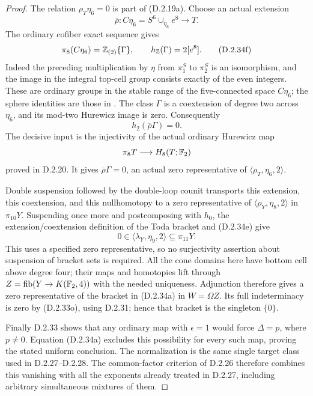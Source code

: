 \begin{proof}
The relation $\rho_T\eta_6=0$ is part of
\textup{(D.2.19a)}. Choose an actual extension
\[
 \overline\rho:C\eta_6=S^6\cup_{\eta_6}e^8
                      \longrightarrow T.
\]
The ordinary cofiber exact sequence gives
\[
 \pi_8(C\eta_6)=\mathbb Z_{(2)}\{\Gamma\},
       \qquad h_{\mathbb Z}(\Gamma)=2[e^8].
 \tag{D.2.34f}
\]
Indeed the preceding multiplication by $\eta$ from
$\pi_1^S$ to $\pi_2^S$ is an isomorphism, and the
image in the integral top-cell group consists exactly
of the even integers. These are ordinary groups in
the stable range of the five-connected space $C\eta_6$;
the sphere identities are those in
\cite[\S2, (2.1), p.~149]{I_Oka1986}.
The class $\Gamma$ is a coextension of degree two
across $\eta_6$, and its mod-two Hurewicz image is zero.
Consequently
\[
 h_2(\overline\rho\Gamma)=0.
\]
The decisive input is the injectivity of the actual
ordinary Hurewicz map
\[
               \pi_8T\longrightarrow H_8(T;\mathbb F_2)
\]
proved in \textup{D.2.20}. It gives
$\overline\rho\Gamma=0$, an actual zero representative
of $\langle\rho_T,\eta_6,2\rangle$.

Double suspension followed by the double-loop counit
transports this extension, this coextension, and this
nullhomotopy to a zero representative of
$\langle\rho_Y,\eta_8,2\rangle$ in $\pi_{10}Y$.
Suspending once more and postcomposing with $h_0$,
the extension/coextension definition of the Toda bracket
and \textup{(D.2.34e)} give
\[
            0\in\langle\lambda_Y,\eta_9,2\rangle
                    \subseteq\pi_{11}Y.
 \tag{D.2.34g}
\]
This uses a specified zero representative, so no
surjectivity assertion about suspension of bracket sets
is required. All the cone domains here have bottom cell
above degree four; their maps and homotopies lift through
$Z=\operatorname{fib}(Y\to K(\mathbb F_2,4))$ with the needed uniqueness.
Adjunction therefore gives a zero representative of the
bracket in \textup{(D.2.34a)} in $W=\Omega Z$.
Its full indeterminacy is zero by
\textup{(D.2.33o)}, using \textup{D.2.31}; hence that
bracket is the singleton $\{0\}$.

Finally \textup{D.2.33} shows that any ordinary map with
$\epsilon=1$ would force $\Delta=p$, where $p\ne0$.
Equation \textup{(D.2.34a)} excludes this possibility
for every such map, proving the stated uniform conclusion.
The normalization is the same single target class used in
\textup{D.2.27--D.2.28}. The common-factor criterion of
\textup{D.2.26} therefore combines this vanishing with all
the exponents already treated in \textup{D.2.27}, including
arbitrary simultaneous mixtures of them.
\end{proof}
